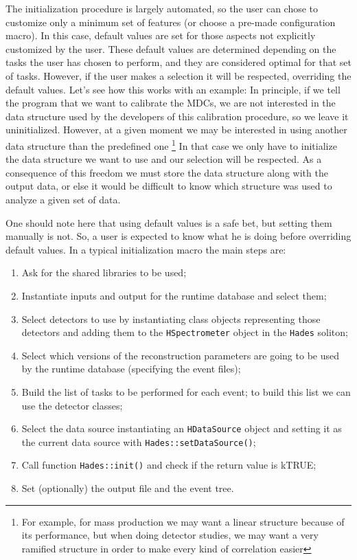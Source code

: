 The initialization procedure is largely automated, so the user can chose to customize 
only a minimum set of features (or choose a pre-made configuration macro). In this case, 
default values are set for those aspects not explicitly customized by the user. 
These default values are determined depending on the tasks the user has chosen to 
perform, and they are considered optimal for that set of tasks. However, if the 
user makes a selection it will be respected, overriding the default values. Let's 
see how this works with an example:
In principle, if we tell the program that we want to calibrate the MDCs, we are not 
interested in the data structure used by the developers of this calibration procedure, 
so we leave it uninitialized. However, at a given moment we may be interested in using 
another data structure than the predefined one
\footnote{For example, for mass production we may want a linear structure because of 
its performance, but when doing detector studies, we may want a very ramified structure 
in order to make every kind of correlation easier} 
In that case we only have to initialize the data structure we want to use and our 
selection will be respected. As a consequence of this freedom we must store the 
data structure along with the output data, or else it would be difficult to know 
which structure was used to analyze a given set of data.

One should note here that using default values is a safe bet, but setting them manually 
is not. So, a user is expected to know what he is doing before overriding default values.
In a typical initialization macro the main steps are:
\begin{enumerate}
 \item Ask for the shared libraries to be used;
 \item Instantiate inputs and output for the runtime database and select them;
 \item Select detectors to use by instantiating class objects representing those 
 detectors and adding them to the \verb+HSpectrometer+ object in the \verb+Hades+ soliton;
 \item Select which versions of the reconstruction parameters are going to be used 
 by the runtime database (specifying the event files);
 \item Build the list of tasks to be performed for each event; to build this list we 
 can use the detector classes;
 \item Select the data source instantiating an \verb+HDataSource+ object and setting 
 it as the current data source with \verb+Hades::setDataSource()+;
 \item Call function \verb+Hades::init()+ and check if the return value is kTRUE;
 \item Set (optionally) the output file and the event tree. 
\end{enumerate}

